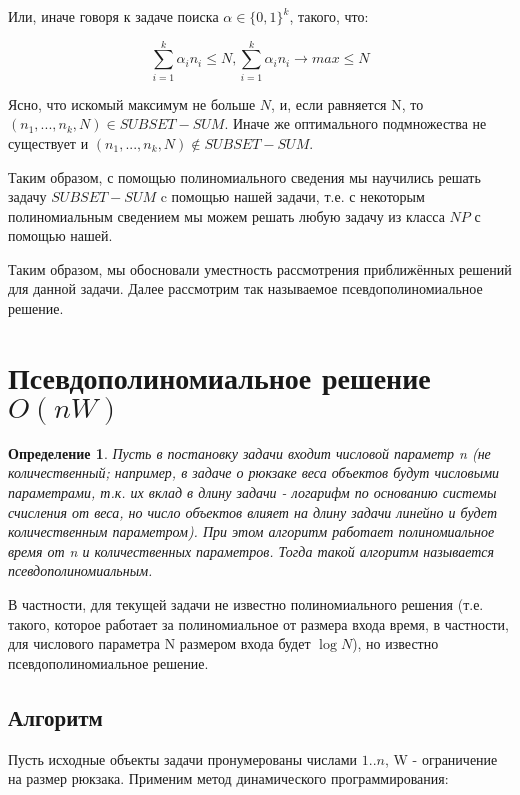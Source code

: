 \documentclass{article}
\newtheorem{definition}{Определение} %
\begin{document}
	Или, иначе говоря к задаче поиска $\alpha \in \{0, 1\}^k$, такого, что:
	
	$$\sum\limits_{i = 1}^{k} {\alpha_i n_i} \leq N, \sum\limits_{i = 1}^{k} {\alpha_i n_i} \rightarrow max \leq N$$ 
	
	Ясно, что искомый максимум не больше $N$, и, если равняется N, то $(n_1 , . . . , n_k , N ) \in SUBSET-SUM$. Иначе же оптимального подмножества не существует и $(n_1 , . . . , n_k , N ) \not\in SUBSET-SUM$.
	
	Таким образом, с помощью полиномиального сведения мы научились решать задачу $SUBSET-SUM$ c помощью нашей задачи, т.е. с некоторым полиномиальным сведением мы можем решать любую задачу из класса $NP$ с помощью нашей.
	
	Таким образом, мы обосновали уместность рассмотрения приближённых решений для данной задачи. Далее рассмотрим так называемое псевдополиномиальное решение. 
	
	
	\section{Псевдополиномиальное решение $O(nW)$}
	
	\begin{definition}
		Пусть в постановку задачи входит числовой параметр n (не количественный; например, в задаче о рюкзаке веса объектов будут числовыми параметрами, т.к. их вклад в длину задачи - логарифм по основанию системы счисления от веса, но число объектов влияет на длину задачи линейно и будет количественным параметром). При этом алгоритм работает полиномиальное время от n и количественных параметров. Тогда такой алгоритм называется псевдополиномиальным.
	\end{definition}
	В частности, для текущей задачи не известно полиномиального решения (т.е. такого, которое работает за полиномиальное от размера входа время, в частности, для числового параметра N размером входа будет $\log{N}$), но известно псевдополиномиальное решение.
	
	\subsection{Алгоритм}
	
	
	Пусть исходные объекты задачи пронумерованы числами $1..n$, W - ограничение на размер рюкзака. Применим метод динамического программирования:
	
	
\end{document}
